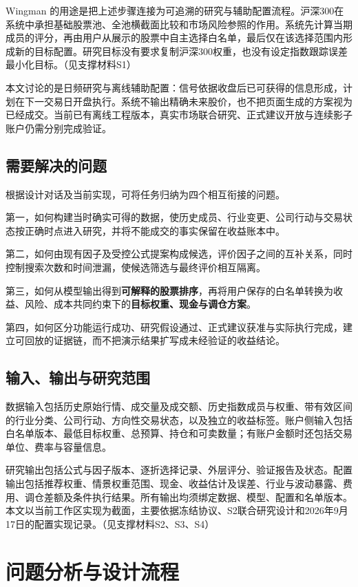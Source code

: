 \documentclass[UTF8,12pt,a4paper,fontset=none]{ctexart}
\begin{document}
Wingman 的用途是把上述步骤连接为可追溯的研究与辅助配置流程。沪深300在系统中承担基础股票池、全池横截面比较和市场风险参照的作用。系统先计算当期成员的评分，再由用户从展示的股票中自主选择白名单，最后仅在该选择范围内形成新的目标配置。研究目标没有要求复制沪深300权重，也没有设定指数跟踪误差最小化目标。（见支撑材料S1）


本文讨论的是日频研究与离线辅助配置：信号依据收盘后已可获得的信息形成，计划在下一交易日开盘执行。系统不输出精确未来股价，也不把页面生成的方案视为已经成交。当前已有离线工程版本，真实市场联合研究、正式建议开放与连续影子账户仍需分别完成验证。


\subsection{需要解决的问题}

根据设计对话及当前实现，可将任务归纳为四个相互衔接的问题。


第一，如何构建当时确实可得的数据，使历史成员、行业变更、公司行动与交易状态按正确时点进入研究，并将不能成交的事实保留在收益账本中。


第二，如何由现有因子及受控公式提案构成候选，评价因子之间的互补关系，同时控制搜索次数和时间泄漏，使候选筛选与最终评价相互隔离。


第三，如何从模型输出得到\textbf{可解释的股票排序}，再将用户保存的白名单转换为收益、风险、成本共同约束下的\textbf{目标权重、现金与调仓方案}。


第四，如何区分功能运行成功、研究假设通过、正式建议获准与实际执行完成，建立可回放的证据链，而不把演示结果扩写成未经验证的收益结论。


\subsection{输入、输出与研究范围}

数据输入包括历史原始行情、成交量及成交额、历史指数成员与权重、带有效区间的行业分类、公司行动、方向性交易状态，以及独立的收益标签。账户侧输入包括白名单版本、最低目标权重、总预算、持仓和可卖数量；有账户金额时还包括交易单位、费率与容量信息。


研究输出包括公式与因子版本、逐折选择记录、外层评分、验证报告及状态。配置输出包括推荐权重、情景权重范围、现金、收益估计及误差、行业与波动暴露、费用、调仓差额及条件执行结果。所有输出均须绑定数据、模型、配置和名单版本。本文以当前工作区实现为截面，主要依据冻结协议、S2联合研究设计和2026年9月17日的配置实现记录。（见支撑材料S2、S3、S4）


\section{问题分析与设计流程}
\end{document}

